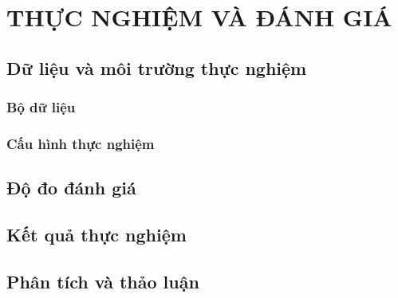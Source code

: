 \chapter{THỰC NGHIỆM VÀ ĐÁNH GIÁ}
\label{chap:thucnghiem}

\section{Dữ liệu và môi trường thực nghiệm}
\subsection{Bộ dữ liệu}
\subsection{Cấu hình thực nghiệm}

\section{Độ đo đánh giá}

\section{Kết quả thực nghiệm}

\section{Phân tích và thảo luận}
